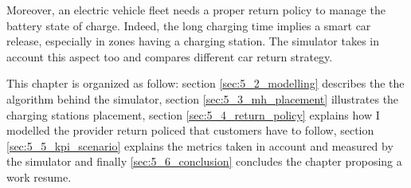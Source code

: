Moreover, an electric vehicle fleet needs a proper return policy to manage the battery state of charge. Indeed, the long charging time implies a smart car release, especially in zones having a charging station. The simulator takes in account this aspect too and compares different car return strategy.

This chapter is organized as follow: section \ref{sec:5_2_modelling} describes the the algorithm behind the simulator, section \ref{sec:5_3_mh_placement} illustrates the charging stations placement, section \ref{sec:5_4_return_policy} explains how I modelled the provider return policed that customers have to follow, section \ref{sec:5_5_kpi_scenario} explains the metrics taken in account and measured by the simulator and finally \ref{sec:5_6_conclusion} concludes the chapter proposing a work resume.
